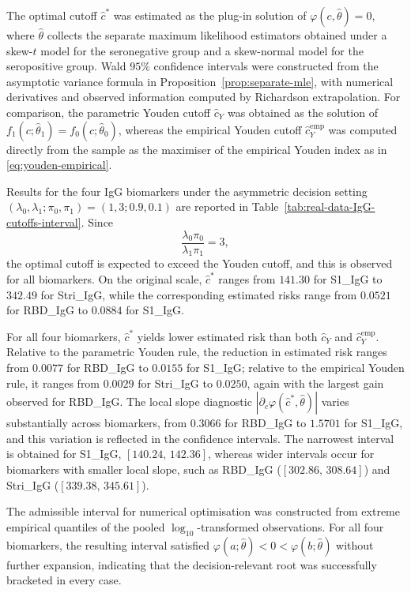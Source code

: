 \documentclass[11pt,a4paper]{article}
\theoremstyle{definition}
\theoremstyle{remark}
\newcommand{\1}{\mathbf{1}}
\begin{document}
The optimal cutoff $\hat c^*$ was estimated as the plug-in
solution of $\varphi(c,\hat\theta)=0$, where $\hat\theta$
collects the separate maximum likelihood estimators obtained
under a skew-$t$ model for the seronegative group and a
skew-normal model for the seropositive group.
Wald $95\%$ confidence intervals were constructed from the
asymptotic variance formula in
Proposition~\ref{prop:separate-mle}, with numerical
derivatives and observed information computed by Richardson
extrapolation.
For comparison, the parametric Youden cutoff $\hat c_Y$ was
obtained as the solution of
$f_1(c;\hat\theta_1)=f_0(c;\hat\theta_0)$, whereas the
empirical Youden cutoff $\hat c_Y^{\mathrm{emp}}$ was
computed directly from the sample as the maximiser of the
empirical Youden index as in \eqref{eq:youden-empirical}.

Results for the four IgG biomarkers under the asymmetric
decision setting
$(\lambda_0,\lambda_1;\pi_0,\pi_1)=(1,3;0.9,0.1)$ are
reported in Table~\ref{tab:real-data-IgG-cutoffs-interval}.
Since
\[
\frac{\lambda_0\pi_0}{\lambda_1\pi_1}=3,
\]
the optimal cutoff is expected to exceed the Youden cutoff,
and this is observed for all biomarkers.
On the original scale, $\hat c^*$ ranges from $141.30$
for S1\_IgG to $342.49$ for Stri\_IgG, while the
corresponding estimated risks range from $0.0521$
for RBD\_IgG to $0.0884$ for S1\_IgG.

For all four biomarkers, $\hat c^*$ yields lower estimated
risk than both $\hat c_Y$ and
$\hat c_Y^{\mathrm{emp}}$.
Relative to the parametric Youden rule, the reduction in
estimated risk ranges from $0.0077$ for RBD\_IgG to
$0.0155$ for S1\_IgG; relative to the empirical Youden
rule, it ranges from $0.0029$ for Stri\_IgG to $0.0250$,
again with the largest gain observed for RBD\_IgG.
The local slope diagnostic
$|\partial_c\varphi(\hat c^*,\hat\theta)|$ varies
substantially across biomarkers, from $0.3066$
for RBD\_IgG to $1.5701$ for S1\_IgG, and this
variation is reflected in the confidence intervals.
The narrowest interval is obtained for S1\_IgG,
$[140.24,\,142.36]$, whereas wider intervals occur for
biomarkers with smaller local slope, such as RBD\_IgG
($[302.86,\,308.64]$) and Stri\_IgG
($[339.38,\,345.61]$).

The admissible interval for numerical optimisation was
constructed from extreme empirical quantiles of the pooled
$\log_{10}$-transformed observations.
For all four biomarkers, the resulting interval satisfied
$\varphi(a;\hat\theta)<0<\varphi(b;\hat\theta)$ without
further expansion, indicating that the decision-relevant
root was successfully bracketed in every case.
\end{document}
